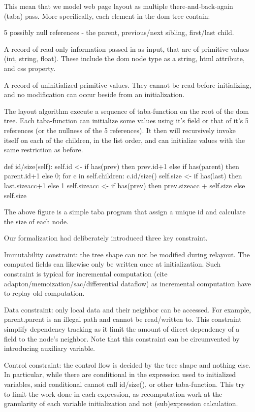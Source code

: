 \documentclass[format=acmsmall, review=false, screen=true]{acmart}
\begin{document}
This mean that we model web page layout as multiple there-and-back-again (taba) pass. More specifically, each element in the dom tree contain:

5 possibly null references - the parent, previous/next sibling, first/last child.

A record of read only information passed in as input, that are of primitive values (int, string, float). These include the dom node type as a string, html attribute, and css property.

A record of uninitialized primitive values. They cannot be read before initializing, and no modification can occur beside from an initialization.

The layout algorithm execute a sequence of taba-function on the root of the dom tree. Each taba-function can initialize some values using it's field or that of it's 5 references (or the nullness of the 5 references). It then will recursively invoke itself on each of the children, in the list order, and can initialize values with the same restriction as before.

def id/size(self):
  self.id <-
    if has(prev) then prev.id+1
    else if has(parent) then parent.id+1
    else 0;
  for c in self.children:
    c.id/size()
  self.size <-
    if has(last) then last.sizeacc+1
    else 1
  self.sizeacc <-
    if has(prev) then prev.sizeacc + self.size
    else self.size

The above figure is a simple taba program that assign a unique id and calculate the size of each node.

Our formalization had deliberately introduced three key constraint.

Immutability constraint: the tree shape can not be modified during relayout. The computed fields can likewise only be written once at initialization. Such constraint is typical for incremental computation (cite adapton/memoization/sac/differential dataflow) as incremental computation have to replay old computation. 

Data constraint: only local data and their neighbor can be accessed. For example, parent.parent is an illegal path and cannot be read/written to. This constraint simplify dependency tracking as it limit the amount of direct dependency of a field to the node's neighbor. Note that this constraint can be circumvented by introducing auxiliary variable.

Control constraint: the control flow is decided by the tree shape and nothing else. In particular, while there are conditional in the expression used to initialized variables, said conditional cannot call id/size(), or other taba-function. This try to limit the work done in each expression, as recomputation work at the granularity of each variable initialization and not (sub)expression calculation.
\end{document}
